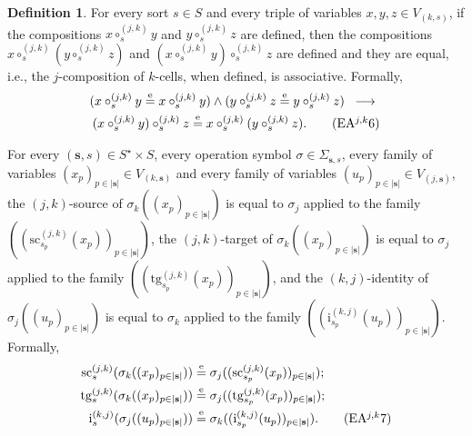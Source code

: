\documentclass{amsart}
\theoremstyle{plain}
\theoremstyle{definition}
\newtheorem{definition}[theorem]{Definition}
\begin{document}
\begin{definition}
For every sort $s\in S$ and every triple of variables $x, y, z\in V_{(k,s)}$, if the compositions $x\circ^{(j,k)}_{s}y$ and $y\circ^{(j,k)}_{s}z$ are defined, then the compositions $x\circ^{(j,k)}_{s}(y\circ^{(j,k)}_{s}z)$ and $(x\circ^{(j,k)}_{s}y)\circ^{(j,k)}_{s}z$ are defined and they are equal, i.e., the $j$-composition of $k$-cells, when defined, is associative. Formally,
\allowdisplaybreaks
\begin{multline*}
(x\circ^{(j,k)}_{s}y\overset{\mathrm{e}}{=} x\circ^{(j,k)}_{s}y)
\wedge
(y\circ^{(j,k)}_{s}z\overset{\mathrm{e}}{=} y\circ^{(j,k)}_{s}z)\;\;
\longrightarrow \;\;\\
(x\circ^{(j,k)}_{s}y)\circ^{(j,k)}_{s}z\overset{\mathrm{e}}{=} x\circ^{(j,k)}_{s}(y\circ^{(j,k)}_{s}z).\label{DVarExtendedEAjk6}\tag{EA$^{j,k}$6}
\end{multline*}

For every $(\mathbf{s},s)\in S^{\star}\times S$, every operation symbol $\sigma\in \Sigma_{\mathbf{s},s}$, every family of variables $(x_{p})_{p\in \lvert\mathbf{s}\rvert}\in V_{(k,\mathbf{s})}$ and every family of variables $(u_{p})_{p\in \lvert\mathbf{s}\rvert}\in V_{(j,\mathbf{s})}$, the $(j,k)$-source of $\sigma_{k}((x_{p})_{p\in \lvert\mathbf{s}\rvert})$ is equal to $\sigma_{j}$ applied to the family $((\mathrm{sc}^{(j,k)}_{s_{p}}(x_{p}))_{p\in \lvert\mathbf{s}\rvert})$, the $(j,k)$-target of $\sigma_{k}((x_{p})_{p\in \lvert\mathbf{s}\rvert})$ is equal to $\sigma_{j}$ applied to the family $((\mathrm{tg}^{(j,k)}_{s_{p}}(x_{p}))_{p\in \lvert\mathbf{s}\rvert})$, and the $(k,j)$-identity of $\sigma_{j}((u_{p})_{p\in \lvert\mathbf{s}\rvert})$ is equal to $\sigma_{k}$ applied to the family $((\mathrm{i}^{(k,j)}_{s_{p}}(u_{p}))_{p\in \lvert\mathbf{s}\rvert})$. Formally,
\allowdisplaybreaks
\begin{align*}
\mathrm{sc}^{(j,k)}_{s}(\sigma_{k}((x_{p})_{p\in \lvert\mathbf{s}\rvert}))&\overset{\mathrm{e}}{=}\sigma_{j}((\mathrm{sc}^{(j,k)}_{s_{p}}(x_{p}))_{p\in \lvert\mathbf{s}\rvert});\\
\mathrm{tg}^{(j,k)}_{s}(\sigma_{k}((x_{p})_{p\in \lvert\mathbf{s}\rvert}))&\overset{\mathrm{e}}{=}\sigma_{j}((\mathrm{tg}^{(j,k)}_{s_{p}}(x_{p}))_{p\in \lvert\mathbf{s}\rvert});\\
\mathrm{i}^{(k,j)}_{s}(\sigma_{j}((u_{p})_{p\in \lvert\mathbf{s}\rvert}))&\overset{\mathrm{e}}{=}\sigma_{k}((\mathrm{i}^{(k,j)}_{s_{p}}(u_{p}))_{p\in \lvert\mathbf{s}\rvert}).\label{DVarExtendedEAjk7}\tag{EA$^{j,k}$7}
\end{align*}


\end{definition}
\end{document}
